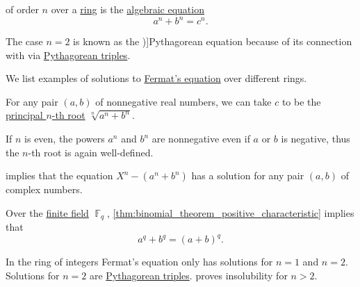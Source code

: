 \begin{definition}\label{def:fermats_equation}
   of order \( n \) over a \hyperref[def:ring]{ring} is the \hyperref[def:polynomial_equation]{algebraic equation}
  \begin{equation}\label{eq:def:fermats_equation}
    a^n + b^n = c^n.
  \end{equation}

  The case \( n = 2 \) is known as the \term[en=Pythagorean equation (\cite[\S 4.3.1]{Deza2012FigurateNumbers})]{Pythagorean equation} because of its connection with  via \hyperref[def:pythagorean_triple]{Pythagorean triples}.
\end{definition}

\begin{example}\label{ex:def:fermats_equation}
  We list examples of solutions to \hyperref[def:fermats_equation]{Fermat's equation} over different rings.
  \begin{thmenum}
     For any pair \( (a, b) \) of nonnegative real numbers, we can take \( c \) to be the \hyperref[def:principal_nonnegative_nth_root]{principal \( n \)-th root} \( \sqrt[n]{ a^n + b^n } \).

    If \( n \) is even, the powers \( a^n \) and \( b^n \) are nonnegative even if \( a \) or \( b \) is negative, thus the \( n \)-th root is again well-defined.

      implies that the equation \( X^n - (a^n + b^n) \) has a solution for any pair \( (a, b) \) of complex numbers.

     Over the \hyperref[def:finite_field]{finite field} \( \BbbF_q \), \cref{thm:binomial_theorem_positive_characteristic} implies that
    \begin{equation*}
      a^q + b^q = (a + b)^q.
    \end{equation*}

     In the ring of integers Fermat's equation only has solutions for \( n = 1 \) and \( n = 2 \). Solutions for \( n = 2 \) are \hyperref[def:pythagorean_triple]{Pythagorean triples}.  proves insolubility for \( n > 2 \).
  \end{thmenum}
\end{example}

